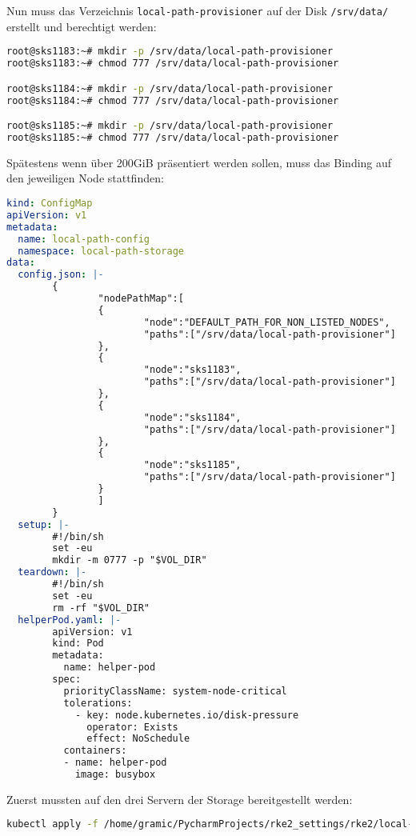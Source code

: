 Nun muss das Verzeichnis \texttt{local-path-provisioner} auf der Disk \texttt{/srv/data/} erstellt und berechtigt werden:
\lstset{style=gra_codestyle}
\begin{lstlisting}[language=bash, caption=local-path-storage 250GiB auf Linux Bereitstellen,captionpos=b,label={lst:local-path-storage-250gib-provide},breaklines=true]
root@sks1183:~# mkdir -p /srv/data/local-path-provisioner
root@sks1183:~# chmod 777 /srv/data/local-path-provisioner

root@sks1184:~# mkdir -p /srv/data/local-path-provisioner
root@sks1184:~# chmod 777 /srv/data/local-path-provisioner

root@sks1185:~# mkdir -p /srv/data/local-path-provisioner
root@sks1185:~# chmod 777 /srv/data/local-path-provisioner
\end{lstlisting}

Spätestens wenn über 200GiB präsentiert werden sollen, muss das Binding auf den jeweiligen Node stattfinden:
\lstset{style=gra_codestyle}
\begin{lstlisting}[language=yaml, caption=local-path-provisioner Grosse Volumes,captionpos=b,label={lst:local-path-provisioner_srv_default.yaml},breaklines=true]
kind: ConfigMap
apiVersion: v1
metadata:
  name: local-path-config
  namespace: local-path-storage
data:
  config.json: |-
        {
                "nodePathMap":[
                {
                        "node":"DEFAULT_PATH_FOR_NON_LISTED_NODES",
                        "paths":["/srv/data/local-path-provisioner"]
                },
                {
                        "node":"sks1183",
                        "paths":["/srv/data/local-path-provisioner"]
                },
                {
                        "node":"sks1184",
                        "paths":["/srv/data/local-path-provisioner"]
                },
                {
                        "node":"sks1185",
                        "paths":["/srv/data/local-path-provisioner"]
                }
                ]
        }
  setup: |-
        #!/bin/sh
        set -eu
        mkdir -m 0777 -p "$VOL_DIR"
  teardown: |-
        #!/bin/sh
        set -eu
        rm -rf "$VOL_DIR"
  helperPod.yaml: |-
        apiVersion: v1
        kind: Pod
        metadata:
          name: helper-pod
        spec:
          priorityClassName: system-node-critical
          tolerations:
            - key: node.kubernetes.io/disk-pressure
              operator: Exists
              effect: NoSchedule
          containers:
          - name: helper-pod
            image: busybox
\end{lstlisting}

Zuerst mussten auf den drei Servern der Storage bereitgestellt werden:
\lstset{style=gra_codestyle}
\begin{lstlisting}[language=bash, caption=local-path-storage 250GiB aktualisieren,captionpos=b,label={lst:local-path-storage-250gib-apply},breaklines=true]
kubectl apply -f /home/gramic/PycharmProjects/rke2_settings/rke2/local-path-provisioner_srv_default.yaml
\end{lstlisting}
